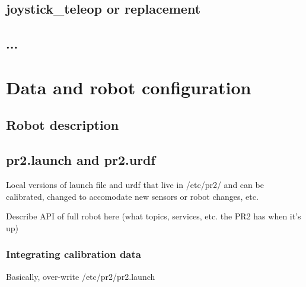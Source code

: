 \subsection{joystick\_teleop or replacement}
\subsection{...}
\section{Data and robot configuration}
\subsection{Robot description}
\subsection{pr2.launch and pr2.urdf}
Local versions of launch file and urdf that live in /etc/pr2/ and can be calibrated, changed to accomodate new sensors or robot changes, etc.

Describe API of full robot here (what topics, services, etc. the PR2 has when it's up)
\subsubsection{Integrating calibration data}
Basically, over-write /etc/pr2/pr2.launch
